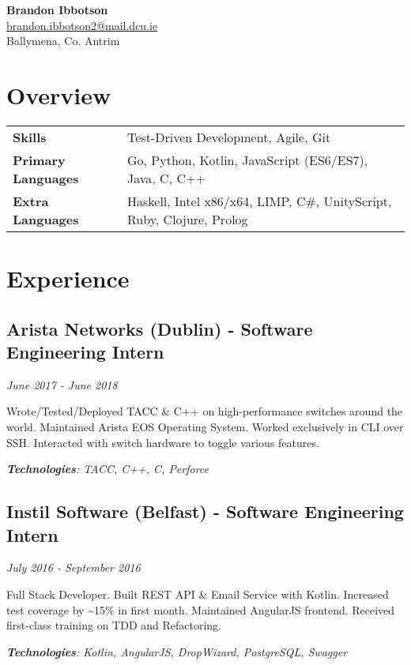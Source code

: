 \documentclass{article}
\newcommand{\youremail}[1]{\href{mailto:#1}{#1}}
\newcommand{\yourtitle}[4]{
  \begin{center}
    {\huge\bfseries #1}\\
    \vspace{0.5em}
    \youremail{#3}\\
    {#2}\\
  \end{center}
}
\begin{document}
\yourtitle{Brandon Ibbotson}{Ballymena, Co. Antrim}{brandon.ibbotson2@mail.dcu.ie}{www.byxor.xyz}
\section{Overview}
\begin{tabularx}{\textwidth}{ll}
\vspace{0.75em}
\textbf{Skills} & Test-Driven Development, {} Agile, {} Git\\
\vspace{0.75em}
\textbf{Primary Languages} & Go, {} Python, {} Kotlin, {} JavaScript (ES6/ES7), {} Java, {} C, {} C++\\
\textbf{Extra Languages} & Haskell, {} Intel x86/x64, {} LIMP, {} C\#, {} UnityScript, {} Ruby, {} Clojure, {} Prolog\\
\end{tabularx}
\section{Experience}
\subsection{Arista Networks (Dublin) - Software Engineering Intern}
\textit{June 2017 - June 2018}

Wrote/Tested/Deployed TACC \& C++ on high-performance switches around the world. Maintained Arista EOS Operating System. Worked exclusively in CLI over SSH. Interacted with switch hardware to toggle various features.

\textit{\textbf{Technologies}: TACC, C++, C, Perforce}
\vspace{0.5em}
\subsection{Instil Software (Belfast) - Software Engineering Intern}
\textit{July 2016 - September 2016}

Full Stack Developer. Built REST API \& Email Service with Kotlin. Increased test coverage by \textasciitilde{}15\% in first month. Maintained AngularJS frontend. Received first-class training on TDD and Refactoring.

\textit{\textbf{Technologies}: Kotlin, AngularJS, DropWizard, PostgreSQL, Swagger}
\vspace{0.5em}
\end{document}
